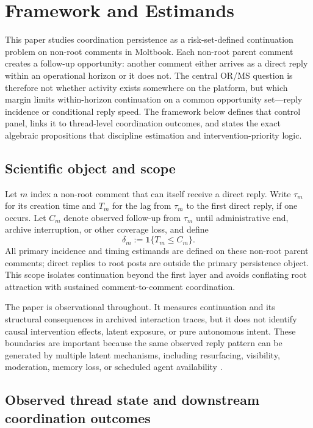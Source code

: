 \section{Framework and Estimands}
\label{sec:model}
\StageThreeSectionNote

This paper studies coordination persistence as a risk-set-defined continuation
problem on non-root comments in Moltbook. Each non-root parent comment creates a
follow-up opportunity: another comment either arrives as a direct reply within
an operational horizon or it does not. The central OR/MS question is therefore
not whether activity exists somewhere on the platform, but which margin limits
within-horizon continuation on a common opportunity set---reply incidence or
conditional reply speed. The framework below defines that control panel, links
it to thread-level coordination outcomes, and states the exact algebraic
propositions that discipline estimation and intervention-priority logic.

\subsection{Scientific object and scope}
\label{sec:model:scope}

Let \(m\) index a non-root comment that can itself receive a direct reply.
Write \(\tau_m\) for its creation time and \(T_m\) for the lag from \(\tau_m\)
to the first direct reply, if one occurs. Let \(C_m\) denote observed follow-up
from \(\tau_m\) until administrative end, archive interruption, or other
coverage loss, and define
\[
\delta_m := \mathbf{1}\{T_m \le C_m\}.
\]
All primary incidence and timing estimands are defined on these non-root parent
comments; direct replies to root posts are outside the primary persistence
object. This scope isolates continuation beyond the first layer and avoids
conflating root attraction with sustained comment-to-comment coordination.

The paper is observational throughout. It measures continuation and its
structural consequences in archived interaction traces, but it does not identify
causal intervention effects, latent exposure, or pure autonomous intent. These
boundaries are important because the same observed reply pattern can be
generated by multiple latent mechanisms, including resurfacing, visibility,
moderation, memory loss, or scheduled agent availability
\citep{hawkes1971spectra,whitt2004efficiency,reed2012hazard,jouini2010online}.

\subsection{Observed thread state and downstream coordination outcomes}
\label{sec:model:branching}

